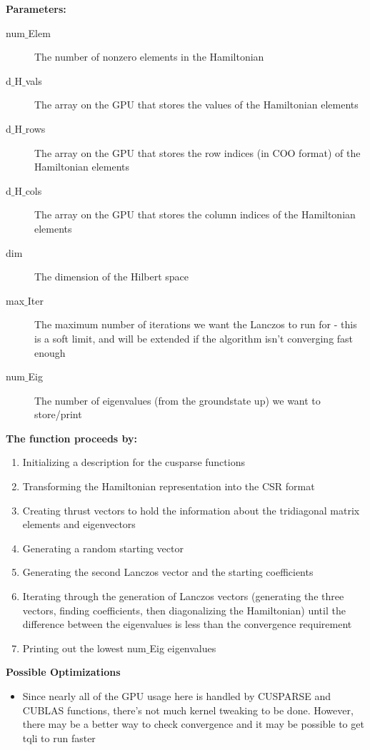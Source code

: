 \documentclass{article}
\begin{document}
{\noindent\textbf{Parameters:}
\begin{description}
\item[num$\_$Elem]{The number of nonzero elements in the Hamiltonian}
\item[d$\_$H$\_$vals]{The array on the GPU that stores the values of the Hamiltonian elements}
\item[d$\_$H$\_$rows]{The array on the GPU that stores the row indices (in COO format) of the Hamiltonian elements}
\item[d$\_$H$\_$cols]{The array on the GPU that stores the column indices of the Hamiltonian elements}
\item[dim]{The dimension of the Hilbert space}
\item[max$\_$Iter]{The maximum number of iterations we want the Lanczos to run for - this is a soft limit, and will be extended if the algorithm isn't converging fast enough}
\item[num$\_$Eig]{The number of eigenvalues (from the groundstate up) we want to store/print}
\end{description}

\noindent\textbf{The function proceeds by:}
\begin{enumerate}
\item{Initializing a description for the cusparse functions}
\item{Transforming the Hamiltonian representation into the CSR format}
\item{Creating thrust vectors to hold the information about the tridiagonal matrix elements and eigenvectors}
\item{Generating a random starting vector}
\item{Generating the second Lanczos vector and the starting coefficients}
\item{Iterating through the generation of Lanczos vectors (generating the three vectors, finding coefficients, then diagonalizing the Hamiltonian) until the difference between the eigenvalues is less than the convergence requirement}
\item{Printing out the lowest num$\_$Eig eigenvalues}
\end{enumerate}

\noindent\textbf{Possible Optimizations}
\begin{itemize}
\item{Since nearly all of the GPU usage here is handled by CUSPARSE and CUBLAS functions, there's not much kernel tweaking to be done. However, there may be a better way to check convergence and it may be possible to get tqli to run faster}
\end{itemize}

}
\end{document}
